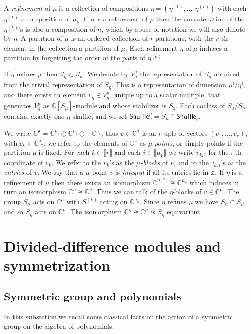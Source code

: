 \documentclass[11pt,fleqn]{article}
\newcommand\CC{\mathbb C}
\newcommand\ZZ{\mathbb Z}
\newcommand\interval[1]{\llbracket #1 \rrbracket}
\newcommand\Shuffle{\mathsf{Shuffle}}
\begin{document}
A \emph{refinement} of $\mu$ is a collection of compositions $\eta = 
(\eta^{(1)},\ldots, \eta^{(r)})$ with each $\eta^{(k)}$ a composition of 
$\mu_k$. If $\eta$ is a refinement of $\mu$ then the concatenation of the 
$\eta^{(k)}$'s is also a composition of $n$, which by abuse of notation we 
will also denote by $\eta$. A partition of $\mu$ is an ordered collection of 
$r$ partitions, with the $r$-th element in the collection a partition of 
$\mu$. Each refinement $\eta$ of $\mu$ induces a partition by forgetting the 
order of the parts of $\eta^{(k)}$.

If $\eta$ refines $\mu$ then $S_\eta \subset S_\mu$. We denote by $V_\eta^\mu$
the representation of $S_\mu$ obtained from the trivial representation of 
$S_\eta$. This is a representation of dimension $\mu!/\eta!$, and there exists
an element $v_\eta \in V_\eta^\mu$, unique up to a scalar multiple, that
generates $V_\eta^\mu$ as $\CC[S_\mu]$-module and whose stabilizer is $S_\eta$.
Each coclass of $S_\mu / S_\eta$ contains exactly one $\eta$-shuffle, and we
set $\Shuffle^\mu_\eta = S_\mu \cap \Shuffle_\eta$.

We write $\CC^{\mu} = \CC^{\mu_1} \oplus \CC^{\mu_2} \oplus \cdots 
\CC^{\mu_r}$; thus $v \in \CC^{\mu}$ is an $r$-uple of vectors $(v_1, \ldots,
v_r)$, with $v_k \in \CC^{\mu_k}$; we refer to the elements of $\CC^\mu$ as 
\emph{$\mu$-points}, or simply points if the partition $\mu$ is fixed. 
For each $k \in \interval{r}$ and each $i \in \interval{\mu_k}$ we write 
$v_{k,i}$ for the $i$-th coordinate of $v_k$. We refer to the $v_k$'s as the 
\emph{$\mu$-blocks} of $v$, and to the $v_{k,i}$'s as the \emph{entries} of 
$v$. We say that a $\mu$-point $v$ is \emph{integral} if all its entries lie 
in $\ZZ$. If $\eta$ is a refinement of $\mu$ then there exists an isomorphism 
$\CC^{\eta^{(k)}} \cong \CC^{\mu_k}$ which induces in turn an isomorphism 
$\CC^\eta \cong \CC^\nu$. Thus we can talk of the $\eta$-blocks of $v \in 
\CC^\mu$. The group $S_\mu$ acts on $\CC^\mu$ with $S^{(k)}$ acting on 
$\CC^{\mu_k}$. Since $\eta$ refines $\mu$ we have $S_\eta \subset S_\mu$ and 
so $S_\eta$ acts on $\CC^\mu$. The isomorphism $\CC^\eta \cong \CC^\mu$ is 
$S_\eta$ equivariant

\section{Divided-difference modules and symmetrization}
\label{modules-of-divided-differences}

\subsection{Symmetric group and polynomials}
In this subsection we recall some classical facts on the action of a symmetric
group on the algebra of polynomials.
\end{document}
